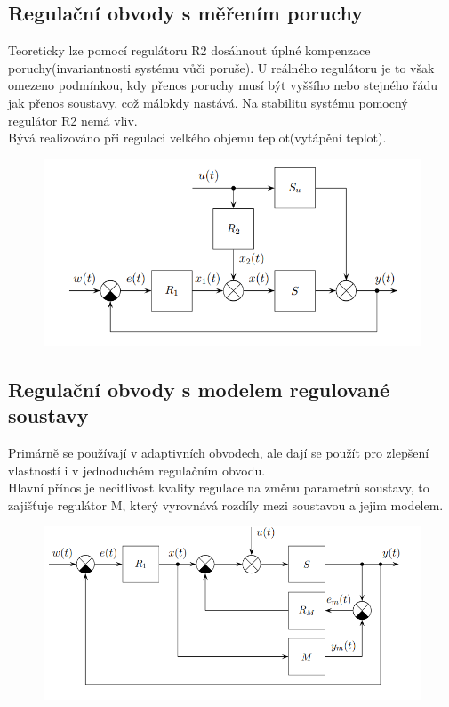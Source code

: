 \subsection*{Regulační obvody s měřením poruchy}
Teoreticky lze pomocí regulátoru R2 dosáhnout úplné kompenzace poruchy(invariantnosti systému vůči poruše). U reálného regulátoru je to však omezeno podmínkou, kdy přenos poruchy musí být vyššího nebo stejného řádu jak přenos soustavy, což málokdy nastává. Na stabilitu systému pomocný regulátor R2 nemá vliv.\\
Bývá realizováno při regulaci velkého objemu teplot(vytápění teplot).
\begin{figure}[H]
    \includegraphics*[scale = 1]{images/pomocnaPorucha.png}
\end{figure}

\subsection*{Regulační obvody s modelem regulované soustavy}
Primárně se používají v adaptivních obvodech, ale dají se použít pro zlepšení vlastností i v jednoduchém regulačním obvodu.\\
Hlavní přínos je necitlivost kvality regulace na změnu parametrů soustavy, to zajišťuje regulátor M, který vyrovnává rozdíly mezi soustavou a jejim modelem.
\begin{figure}[H]
    \includegraphics*[scale = 1]{images/pomocnaModelRegulovaneSoustavy.png}
\end{figure}
\newpage

